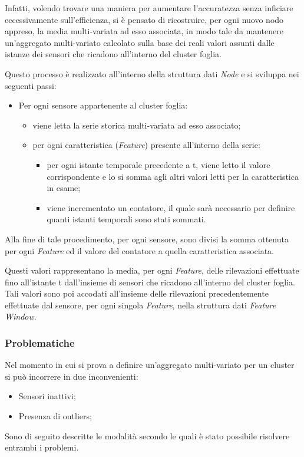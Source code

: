 \documentclass[12pt,a4paper,twoside,openright]{book}
\begin{document}
Infatti, volendo trovare una maniera per aumentare l'accuratezza senza inficiare eccessivamente sull'efficienza, si è pensato di ricostruire, per ogni nuovo nodo appreso, la media multi-variata ad esso associata, in modo tale da mantenere un'aggregato multi-variato calcolato sulla base dei reali valori assunti dalle istanze dei sensori che ricadono all'interno del cluster foglia.

Questo processo è realizzato all'interno della struttura dati \textit{Node} e si sviluppa nei seguenti passi:
\begin{itemize}
\item Per ogni sensore appartenente al cluster foglia:
\begin{itemize}
\item viene letta la serie storica multi-variata ad esso associato;
\item per ogni caratteristica (\textit{Feature}) presente all'interno della serie:
\begin{itemize}
\item per ogni istante temporale precedente a t, viene letto il valore corrispondente e lo si somma agli altri valori letti per la caratteristica in esame;
\item viene incrementato un contatore, il quale sarà necessario per definire quanti istanti temporali sono stati sommati.
\end{itemize}
\end{itemize}
\end{itemize}

Alla fine di tale procedimento, per ogni sensore, sono divisi la somma ottenuta per ogni \textit{Feature} ed il valore del contatore a quella caratteristica associata.

Questi valori rappresentano la media, per ogni \textit{Feature}, delle rilevazioni effettuate fino all'istante t dall'insieme di sensori che ricadono all'interno del cluster foglia.
Tali valori sono poi accodati all'insieme delle rilevazioni precedentemente effettuate dal sensore, per ogni singola \textit{Feature}, nella struttura dati \textit{Feature Window}. 
\subsubsection{Problematiche}
Nel momento in cui si prova a definire un'aggregato multi-variato per un cluster si può incorrere in due inconvenienti:
\begin{itemize}
\item Sensori inattivi;
\item Presenza di outliers;
\end{itemize}
Sono di seguito descritte le modalità secondo le quali è stato possibile risolvere entrambi i problemi.
\end{document}
